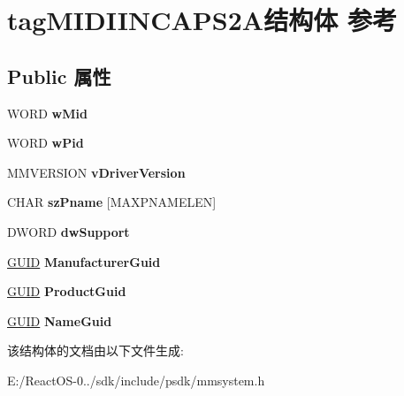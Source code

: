 \hypertarget{structtag_m_i_d_i_i_n_c_a_p_s2_a}{}\section{tag\+M\+I\+D\+I\+I\+N\+C\+A\+P\+S2\+A结构体 参考}
\label{structtag_m_i_d_i_i_n_c_a_p_s2_a}
\subsection*{Public 属性}
\begin{DoxyCompactItemize}
\item 
\mbox{\label{structtag_m_i_d_i_i_n_c_a_p_s2_a_ac40d1d7e5b033b50812a971e6fc1f29b}} 
W\+O\+RD {\bfseries w\+Mid}
\item 
\mbox{\label{structtag_m_i_d_i_i_n_c_a_p_s2_a_adcd152533c5768ba32d5334092ce6c21}} 
W\+O\+RD {\bfseries w\+Pid}
\item 
\mbox{\label{structtag_m_i_d_i_i_n_c_a_p_s2_a_af94d83677ba94c9682f794db85b1dd84}} 
M\+M\+V\+E\+R\+S\+I\+ON {\bfseries v\+Driver\+Version}
\item 
\mbox{\label{structtag_m_i_d_i_i_n_c_a_p_s2_a_ad6eed5f35f91d4b2ec4758c8c7e4c24e}} 
C\+H\+AR {\bfseries sz\+Pname} \mbox{[}M\+A\+X\+P\+N\+A\+M\+E\+L\+EN\mbox{]}
\item 
\mbox{\label{structtag_m_i_d_i_i_n_c_a_p_s2_a_a0be40f0000e1e1cb30d6cbd98734fe4e}} 
D\+W\+O\+RD {\bfseries dw\+Support}
\item 
\mbox{\label{structtag_m_i_d_i_i_n_c_a_p_s2_a_a7bb050ddc2c2412ff35abd717e476c03}} 
\hyperlink{interface_g_u_i_d}{G\+U\+ID} {\bfseries Manufacturer\+Guid}
\item 
\mbox{\label{structtag_m_i_d_i_i_n_c_a_p_s2_a_aac5b56791a245fb9f2d9fecf7f29ef0e}} 
\hyperlink{interface_g_u_i_d}{G\+U\+ID} {\bfseries Product\+Guid}
\item 
\mbox{\label{structtag_m_i_d_i_i_n_c_a_p_s2_a_ae01b1c3f858ec1f2121f4bff5343417b}} 
\hyperlink{interface_g_u_i_d}{G\+U\+ID} {\bfseries Name\+Guid}
\end{DoxyCompactItemize}


该结构体的文档由以下文件生成\+:\begin{DoxyCompactItemize}
\item 
E\+:/\+React\+O\+S-\/0../sdk/include/psdk/mmsystem.\+h\end{DoxyCompactItemize}
